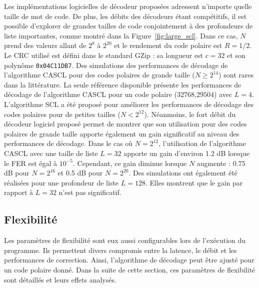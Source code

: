 Les implémentations logicielles de décodeur proposées adressent n'importe quelle taille de mot de code. De plus, les débits des décodeurs étant compétitifs, il est possible d'explorer de grandes tailles de code conjointement à des profondeurs de liste importantes, comme montré dans la Figure~\ref{fig:large_scl}. Dans ce cas, $N$ prend des valeurs allant de $2^8$ à $2^{20}$ et le rendement du code polaire est $R=1/2$. Le CRC utilisé est défini dans le standard GZip : sa longueur est $c=32$ et son polynôme \texttt{0x04C11DB7}. 
Des simulations des performances de décodage de l'algorithme CASCL pour des codes polaires de grande taille ($N \geq 2^{14}$) sont rares dans la littérature. La seule référence disponible présente les performances de décodage de l'algorithme CASCL pour un code polaire ($32768$,$29504$) avec $L=4$.
L'algorithme SCL a été proposé pour améliorer les performances de décodage des codes polaires pour de petites tailles ($N<2^{12}$). Néanmoins, le fort débit du décodeur logiciel proposé permet de montrer que son utilisation pour des codes polaires de grande taille apporte également un gain significatif au niveau des performances de décodage. Dans le cas où $N=2^{12}$, l'utilisation de l'algorithme CASCL avec une taille de liste $L=32$ apporte un gain d'environ 1.2 dB lorsque le FER est égal à $10^{-5}$. Cependant, ce gain diminue lorsque $N$ augmente : 0.75 dB pour $N=2^{16}$ et 0.5 dB pour $N=2^{20}$. Des simulations ont également été réalisées pour une profondeur de liste $L=128$. Elles montrent que le gain par rapport à $L=32$ n'est pas significatif.

\subsection{Flexibilité}
Les paramètres de flexibilité sont eux aussi configurables lors de l'exécution du programme. Ils permettent divers compromis entre la latence, le débit et les performances de correction. Ainsi, l'algorithme de décodage peut être ajusté pour un code polaire donné. Dans la suite de cette section, ces paramètres de flexibilité sont détaillés et leurs effets analysés.

